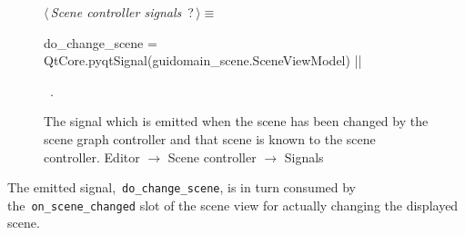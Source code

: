 \documentclass[%
    a4paper,    %
    justified,  %
    nobib,      %
    openany     %
]{tufte-book}
\begin{document}
\begin{figure}
\begin{flushleft} \small
\begin{minipage}{\linewidth}\label{scrap96}\raggedright\small
{} $\langle\,${\itshape Scene controller signals}\nobreak\ {\footnotesize {?}}$\,\rangle\equiv$
\vspace{-1ex}
\begin{pythoncode}
do_change_scene = QtCore.pyqtSignal(guidomain_scene.SceneViewModel)
|\NWsep|
\end{pythoncode}
\vspace{1.5ex}
\footnotesize
\begin{list}{}{\setlength{\itemsep}{-\parsep}\setlength{\itemindent}{-\leftmargin}}
\item \NWtxtMacroRefIn\ .

\item{}
\end{list}
\end{minipage}\vspace{4ex}
\end{flushleft}
\caption{The signal which is emitted when the scene has been changed by the
  scene graph controller and that scene is known to the scene controller.
  \newline{}\newline{}Editor $\rightarrow$ Scene controller $\rightarrow$
  Signals}
\label{editor:lst:scene-controller:signals:do-change-scene}
\end{figure}

The emitted signal,~\verb=do_change_scene=, is in turn consumed by
the~\verb=on_scene_changed= slot of the scene view for actually changing the
displayed scene.
\end{document}
